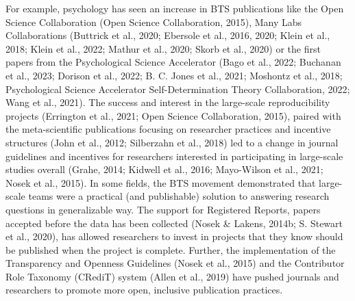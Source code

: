 \documentclass[
  man,floatsintext]{apa7}
\begin{document}
For example, psychology has seen an increase in BTS publications like
the Open Science Collaboration (Open Science Collaboration, 2015), Many
Labs Collaborations (Buttrick et al., 2020; Ebersole et al., 2016, 2020; Klein et al., 2018; Klein et al., 2022; Mathur et al., 2020; Skorb et al., 2020) or the first papers
from the Psychological Science Accelerator (Bago et al., 2022; Buchanan et al., 2023; Dorison et al., 2022; B. C. Jones et al., 2021; Moshontz et al., 2018; Psychological Science Accelerator Self-Determination Theory Collaboration, 2022; Wang et al., 2021). The success and interest in the large-scale
reproducibility projects (Errington et al., 2021; Open Science Collaboration, 2015), paired with the meta-scientific publications
focusing on researcher practices and incentive structures
(John et al., 2012; Silberzahn et al., 2018) led to a change in journal guidelines
and incentives for researchers interested in participating in
large-scale studies overall (Grahe, 2014; Kidwell et al., 2016; Mayo-Wilson et al., 2021; Nosek et al., 2015). In some fields, the BTS movement demonstrated that
large-scale teams were a practical (and publishable) solution to
answering research questions in generalizable way. The support for
Registered Reports, papers accepted before the data has been collected
(Nosek \& Lakens, 2014b; S. Stewart et al., 2020), has allowed researchers to invest in
projects that they know should be published when the project is
complete. Further, the implementation of the Transparency and Openness
Guidelines (Nosek et al., 2015) and the Contributor Role Taxonomy (CRediT)
system (Allen et al., 2019) have pushed journals and researchers to promote more
open, inclusive publication practices.
\end{document}
